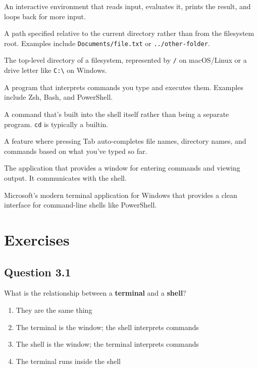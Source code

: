 \documentclass[
  letterpaper,
  DIV=11,
  numbers=noendperiod]{scrreprt}
\providecommand{\tightlist}{%
  \setlength{\itemsep}{0pt}\setlength{\parskip}{0pt}}
\begin{document}
\begin{description}
An interactive environment that reads input, evaluates it, prints the
result, and loops back for more input.
\item[\textbf{Relative path}]
A path specified relative to the current directory rather than from the
filesystem root. Examples include \texttt{Documents/file.txt} or
\texttt{../other-folder}.
\item[\textbf{Root directory}]
The top-level directory of a filesystem, represented by \texttt{/} on
macOS/Linux or a drive letter like \texttt{C:\textbackslash{}} on
Windows.
\item[\textbf{Shell}]
A program that interprets commands you type and executes them. Examples
include Zsh, Bash, and PowerShell.
\item[\textbf{Shell builtin}]
A command that's built into the shell itself rather than being a
separate program. \texttt{cd} is typically a builtin.
\item[\textbf{Tab completion}]
A feature where pressing Tab auto-completes file names, directory names,
and commands based on what you've typed so far.
\item[\textbf{Terminal}]
The application that provides a window for entering commands and viewing
output. It communicates with the shell.
\item[\textbf{Windows Terminal}]
Microsoft's modern terminal application for Windows that provides a
clean interface for command-line shells like PowerShell.
\end{description}

\section{Exercises}\label{exercises-2}

\subsection{Question 3.1}\label{question-3.1}

What is the relationship between a \textbf{terminal} and a
\textbf{shell}?

\begin{enumerate}
\def\labelenumi{\Alph{enumi})}
\tightlist
\item
  They are the same thing\\
\item
  The terminal is the window; the shell interprets commands\\
\item
  The shell is the window; the terminal interprets commands\\
\item
  The terminal runs inside the shell
\end{enumerate}
\end{document}
